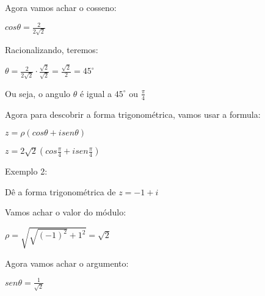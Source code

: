 \documentclass[]{article}
\begin{document}
\begin{large}
\begin{flushleft}
Agora vamos achar o cosseno: \vspace{.3cm}

\begin{center}
    $cos\theta=\frac{2}{2\sqrt{2}}$
\end{center}

Racionalizando, teremos: \vspace{.3cm}

\begin{center}
    $\theta=\frac{2}{2\sqrt{2}} \cdot \frac{\sqrt{2}}{\sqrt{2}} = \frac{\sqrt{2}}{2} = 45^\circ$ \vspace{.3cm}
\end{center}

Ou seja, o angulo $\theta$ é igual a $45^\circ$ ou $\frac{\pi}{4}$ \vspace{.3cm}

Agora para descobrir a forma trigonométrica, vamos usar a formula: \vspace{.3cm}

\begin{center}
    $z=\rho(cos\theta + isen\theta)$ \vspace{.3cm}
    
     \vspace{.3cm}
    
    $z=2\sqrt{2}(cos\frac{\pi}{4} + isen\frac{\pi}{4})$ \vspace{.3cm}
    
     \vspace{.3cm}
\end{center}

Exemplo 2: \vspace{.3cm}

Dê a forma trigonométrica de $z=-1+i$

Vamos achar o valor do módulo: \vspace{.3cm}

\begin{center}
    $\rho=\sqrt{\sqrt{(-1)^2}+1^2} = \sqrt{2}$ \vspace{.3cm}
\end{center}

Agora vamos achar o argumento: \vspace{.3cm}

\begin{center}
    $sen\theta=\frac{1}{\sqrt{2}}$ \vspace{.cm}
\end{center}


\end{flushleft}
\end{large}
\end{document}
